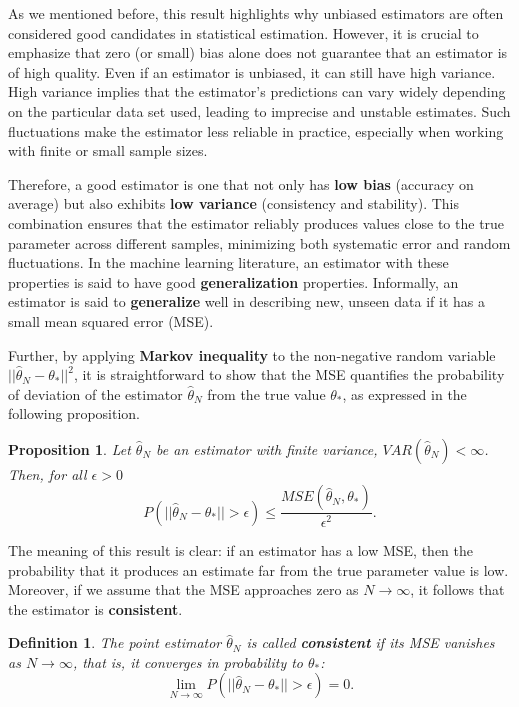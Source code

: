 \documentclass{report}
\newtheorem{definition}{Definition}[chapter]
\newtheorem{proposition}{Proposition}[chapter]
\begin{document}
As we mentioned before, this result highlights why unbiased estimators are often considered good candidates in statistical estimation. However, it is crucial to emphasize that zero (or small) bias alone does not guarantee that an estimator is of high quality. Even if an estimator is unbiased, it can still have high variance. High variance implies that the estimator’s predictions can vary widely depending on the particular data set used, leading to imprecise and unstable estimates. Such fluctuations make the estimator less reliable in practice, especially when working with finite or small sample sizes.

Therefore, a good estimator is one that not only has \textbf{low bias} (accuracy on average) but also exhibits \textbf{low variance} (consistency and stability). This combination ensures that the estimator reliably produces values close to the true parameter across different samples, minimizing both systematic error and random fluctuations. In the machine learning literature, an estimator with these properties is said to have good \textbf{generalization} properties. Informally, an estimator is said to \textbf{generalize} well in describing new, unseen data if it has a small mean squared error (MSE).

Further, by applying \textbf{Markov inequality} to the non-negative random variable $||\hat{\theta}_N- \theta_*||^2$, it is straightforward to show that the MSE quantifies the probability of deviation of the estimator $\hat{\theta}_N$ from the true value $\theta_*$, as expressed in the following proposition.

\begin{proposition}
Let $\hat{\theta}_N$ be an estimator with finite variance, $VAR(\hat{\theta}_N) < \infty$. Then, for all $\epsilon > 0$
\begin{equation}
P(||\hat{\theta}_N -\theta_*|| > \epsilon) \leq \frac{MSE(\hat{\theta}_N,\theta_*)}{\epsilon ^ 2}.
\end{equation}
\end{proposition}

The meaning of this result is clear: if an estimator has a low MSE, then the probability that it produces an estimate far from the true parameter value is low. Moreover, if we assume that the MSE approaches zero as $N \to \infty$, it follows that the estimator is \textbf{consistent}.

\begin{definition}
The point estimator $\hat{\theta}_N$ is called \textbf{consistent} if its MSE vanishes as $N \to \infty$, that is, it converges in probability to $\theta_*$:
\begin{equation}
\lim_{N \to \infty} P(||\hat{\theta}_N -\theta_*|| > \epsilon) = 0.
\end{equation}
\end{definition}
\end{document}
